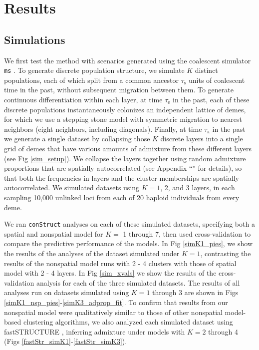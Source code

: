 \documentclass[12pt]{article}
\newcommand{\secref}[1]{``\nameref{#1}''}
\begin{document}
\section*{Results}

\subsection*{Simulations}
We first test the method with scenarios generated using the coalescent simulator \texttt{ms} \citep{Hudson2002}.
To generate discrete population structure, we simulate $K$ distinct populations,
each of which split from a common ancestor $\tau_{\text{s}}$ units of coalescent time in the past,
without subsequent migration between them.
To generate continuous differentiation within each layer,
at time $\tau_{\text{e}}$ in the past,
each of these discrete populations instantaneously colonizes an
independent lattice of demes,
for which we use a stepping stone model with symmetric migration 
to nearest neighbors (eight neighbors, including diagonals).
Finally, at time $\tau_{\text{a}}$ in the past 
we generate a single dataset 
by collapsing those $K$ discrete layers into a single grid of demes 
that have various amounts of admixture from these different layers
(see Fig \ref{sim_setup}). 
We collapse the layers together using random admixture proportions 
that are spatially autocorrelated (see Appendix \secref{sim_details} for details), 
so that both the frequencies in layers and the cluster memberships are
spatially autocorrelated. 
We simulated datasets using $K=1$, 2, and 3 layers,
in each sampling 10,000 unlinked loci from each of 20 haploid individuals from every deme.

We ran \texttt{conStruct} analyses on each of these simulated datasets, 
specifying both a spatial and nonspatial model for $K = $ 1 through 7, 
then used cross-validation to compare the predictive performance of the models.
In Fig \ref{simK1_pies}, we show the results of the analyses of the dataset simulated under $K=1$, 
contrasting the results of the nonspatial model runs with 2 - 4 clusters 
with those of spatial model with 2 - 4 layers.
In Fig \ref{sim_xvals} we show the results of the cross-validation analysis for each of the three simulated datasets.
The results of all analyses run on datasets simulated using $K=1$ through 3 are shown in 
Figs \ref{simK1_nsp_pies}-\ref{simK3_adprop_fit}.
To confirm that results from our nonspatial model were qualitatively similar to those of 
other nonspatial model-based clustering algorithms, 
we also analyzed each simulated dataset using fastSTRUCTURE \citep{fastStructure}, 
inferring admixture under models with $K=2$ through 4 (Figs \ref{fastStr_simK1}-\ref{fastStr_simK3}).
\end{document}
